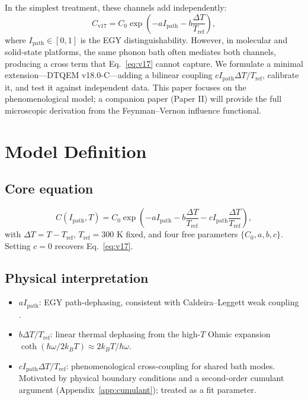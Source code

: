 \documentclass[aps,pra,reprint,amsmath,amssymb,superscriptaddress]{revtex4-2}
\newcommand{\coth}{\operatorname{coth}}
\begin{document}
In the simplest treatment, these channels add independently:
\begin{equation}
C_{\text{v17}} = C_0 \exp\left(-a I_{\text{path}} - b\frac{\Delta T}{T_{\text{ref}}}\right),
\label{eq:v17}
\end{equation}
where $I_{\text{path}} \in [0, 1]$ is the EGY distinguishability. However, in molecular and solid-state platforms, the same phonon bath often mediates both channels, producing a cross term that Eq.~\eqref{eq:v17} cannot capture. We formulate a minimal extension---DTQEM v18.0-C---adding a bilinear coupling $c I_{\text{path}} \Delta T/T_{\text{ref}}$, calibrate it, and test it against independent data. This paper focuses on the phenomenological model; a companion paper (Paper II) will provide the full microscopic derivation from the Feynman--Vernon influence functional.

\section{Model Definition}
\subsection{Core equation}
\begin{equation}
C(I_{\text{path}}, T) = C_0 \exp\left(-a I_{\text{path}} - b \frac{\Delta T}{T_{\text{ref}}} - c I_{\text{path}} \frac{\Delta T}{T_{\text{ref}}}\right),
\label{eq:v18}
\end{equation}
with $\Delta T = T - T_{\text{ref}}$, $T_{\text{ref}} = 300$ K fixed, and four free parameters $\{C_0, a, b, c\}$. Setting $c=0$ recovers Eq.~\eqref{eq:v17}.

\subsection{Physical interpretation}
\begin{itemize}
    \item $a I_{\text{path}}$: EGY path-dephasing, consistent with Caldeira--Leggett weak coupling \cite{Weiss2012}.
    \item $b\Delta T/T_{\text{ref}}$: linear thermal dephasing from the high-$T$ Ohmic expansion $\coth(\hbar\omega/2k_B T) \approx 2k_B T/\hbar\omega$.
    \item $c I_{\text{path}}\Delta T/T_{\text{ref}}$: phenomenological cross-coupling for shared bath modes. Motivated by physical boundary conditions and a second-order cumulant argument (Appendix~\ref{app:cumulant}); treated as a fit parameter.
\end{itemize}
\end{document}
